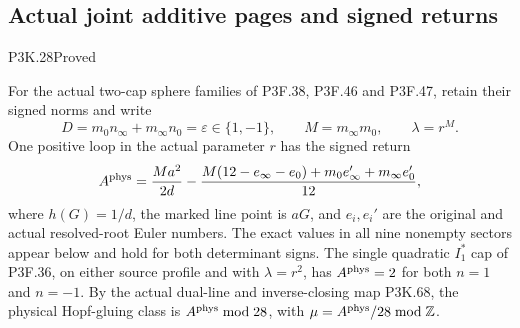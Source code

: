 \subsection{Actual joint additive pages and signed returns}
\begin{statement}{P3K.28}{Proved}

For the actual two-cap sphere families of P3F.38, P3F.46 and P3F.47,
retain their signed norms and write
\[
 D=m_0n_\infty+m_\infty n_0=\varepsilon\in\{1,-1\},
 \qquad M=m_\infty m_0,\qquad \lambda=r^M .
\]
One positive loop in the actual parameter \(r\) has the signed return
\[
 A^{\rm phys}
 =\frac{Ma^2}{2d}
       -\frac{M(12-e_\infty-e_0)+m_0e_\infty'+m_\infty e_0'}{12},
\]
where \(h(G)=1/d\), the marked line point is \(aG\), and
\(e_i,e_i'\) are the original and actual resolved-root Euler numbers.
The exact values in all nine nonempty sectors appear below and hold
for both determinant signs. The single quadratic \(I_1^*\) cap of
P3F.36, on either source profile and with \(\lambda=r^2\),
has \(A^{\rm phys}=2\) for both \(n=1\) and \(n=-1\).
By the actual dual-line and inverse-closing map P3K.68, the physical Hopf-gluing class is \(A^{\rm phys}\bmod28\), with
\(\mu=A^{\rm phys}/28\bmod\mathbb Z\).

\end{statement}
